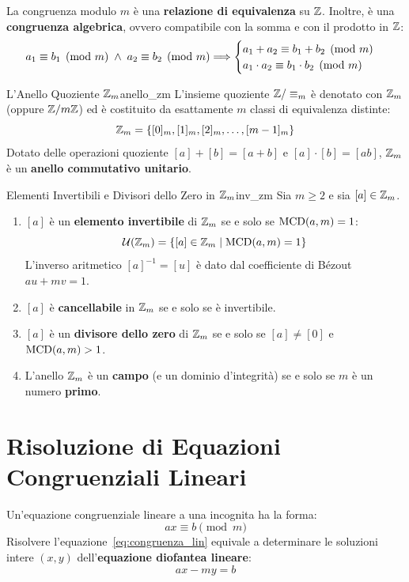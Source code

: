 La congruenza modulo $m$ è una \textbf{relazione di equivalenza} su $\mathbb{Z}$. Inoltre, è una \textbf{congruenza algebrica}, ovvero compatibile con la somma e con il prodotto in $\mathbb{Z}$:
\[
    a_1 \equiv b_1 \pmod m \;\wedge\; a_2 \equiv b_2 \pmod m \Longrightarrow \begin{cases}
        a_1 + a_2 \equiv b_1 + b_2 \pmod m \\
        a_1 \cdot a_2 \equiv b_1 \cdot b_2 \pmod m
    \end{cases}
\]

\begin{definizione}{L'Anello Quoziente $\mathbb{Z}_m$}{anello_zm}
L'insieme quoziente $\mathbb{Z}/\equiv_m$ è denotato con $\mathbb{Z}_m$ (oppure $\mathbb{Z}/m\mathbb{Z}$) ed è costituito da esattamente $m$ classi di equivalenza distinte:
\[
    \mathbb{Z}_m = \{[0]_m, [1]_m, [2]_m, \dots, [m-1]_m\}
\]
Dotato delle operazioni quoziente $[a] + [b] = [a + b]$ e $[a] \cdot [b] = [ab]$, $\mathbb{Z}_m$ è un \textbf{anello commutativo unitario}.
\end{definizione}

\begin{teorema}{Elementi Invertibili e Divisori dello Zero in $\mathbb{Z}_m$}{inv_zm}
Sia $m \ge 2$ e sia $[a] \in \mathbb{Z}_m$.
\begin{enumerate}
    \item $[a]$ è un \textbf{elemento invertibile} di $\mathbb{Z}_m$ se e solo se $\operatorname{MCD}(a, m) = 1$:
    \[
        \mathcal{U}(\mathbb{Z}_m) = \{[a] \in \mathbb{Z}_m \mid \operatorname{MCD}(a, m) = 1\}
    \]
    L'inverso aritmetico $[a]^{-1} = [u]$ è dato dal coefficiente di Bézout $au + mv = 1$.
    \item $[a]$ è \textbf{cancellabile} in $\mathbb{Z}_m$ se e solo se è invertibile.
    \item $[a]$ è un \textbf{divisore dello zero} di $\mathbb{Z}_m$ se e solo se $[a] \neq [0]$ e $\operatorname{MCD}(a, m) > 1$.
    \item L'anello $\mathbb{Z}_m$ è un \textbf{campo} (e un dominio d'integrità) se e solo se $m$ è un numero \textbf{primo}.
\end{enumerate}
\end{teorema}

\section{Risoluzione di Equazioni Congruenziali Lineari}

Un'equazione congruenziale lineare a una incognita ha la forma:
\begin{equation}
\label{eq:congruenza_lin}
    ax \equiv b \pmod m
\end{equation}
Risolvere l'equazione~\eqref{eq:congruenza_lin} equivale a determinare le soluzioni intere $(x, y)$ dell'\textbf{equazione diofantea lineare}:
\[
    ax - my = b
\]

